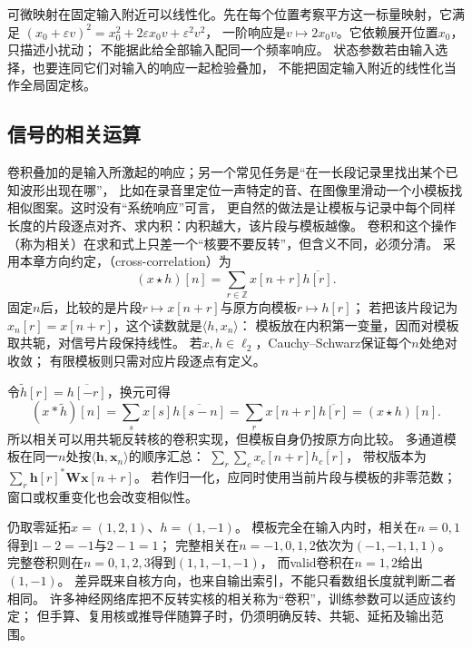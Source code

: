 可微映射在固定输入附近可以线性化。先在每个位置考察平方这一标量映射，它满足
$(x_0+\varepsilon v)^2=x_0^2+2\varepsilon x_0v+\varepsilon^2v^2$，
一阶响应是$v\mapsto2x_0v$。它依赖展开位置$x_0$，只描述小扰动；
不能据此给全部输入配同一个频率响应。
状态参数若由输入选择，也要连同它们对输入的响应一起检验叠加，
不能把固定输入附近的线性化当作全局固定核。

\subsection{信号的相关运算}
\label{sec:signal-template-correlation}

卷积叠加的是输入所激起的响应；另一个常见任务是“在一长段记录里找出某个已知波形出现在哪”，
比如在录音里定位一声特定的音、在图像里滑动一个小模板找相似图案。这时没有“系统响应”可言，
更自然的做法是让模板与记录中每个同样长度的片段逐点对齐、求内积：内积越大，该片段与模板越像。
卷积和这个操作（称为相关）在求和式上只差一个“核要不要反转”，但含义不同，必须分清。
采用本章方向约定，（cross-correlation）为
\begin{equation}
  (x\star h)[n]=\sum_{r\in\mathbb Z}x[n+r]\overline{h[r]}.
  \label{eq:signal-analysis-cross-correlation}
\end{equation}
固定$n$后，比较的是片段$r\mapsto x[n+r]$与原方向模板$r\mapsto h[r]$；
若把该片段记为$x_n[r]=x[n+r]$，这个读数就是$\langle h,x_n\rangle$：
模板放在内积第一变量，因而对模板取共轭，对信号片段保持线性。
若$x,h\in\ell_2$，Cauchy--Schwarz保证每个$n$处绝对收敛；
有限模板则只需对应片段逐点有定义。

令$\widetilde h[r]=\overline{h[-r]}$，换元可得
\[
  (x*\widetilde h)[n]=\sum_s x[s]\overline{h[s-n]}
  =\sum_r x[n+r]\overline{h[r]}=(x\star h)[n].
\]
所以相关可以用共轭反转核的卷积实现，但模板自身仍按原方向比较。
多通道模板在同一$n$处按$\langle\bm h,\bm x_n\rangle$的顺序汇总：
$\sum_r\sum_c x_c[n+r]\overline{h_c[r]}$，
带权版本为$\sum_r\bm h[r]^*\bm W\bm x[n+r]$。
若作归一化，应同时使用当前片段与模板的非零范数；窗口或权重变化也会改变相似性。

仍取零延拓$x=(1,2,1)$、$h=(1,-1)$。
模板完全在输入内时，相关在$n=0,1$得到$1-2=-1$与$2-1=1$；
完整相关在$n=-1,0,1,2$依次为$(-1,-1,1,1)$。
完整卷积则在$n=0,1,2,3$得到$(1,1,-1,-1)$，
而valid卷积在$n=1,2$给出$(1,-1)$。
差异既来自核方向，也来自输出索引，不能只看数组长度就判断二者相同。
许多神经网络库把不反转实核的相关称为“卷积”，训练参数可以适应该约定；
但手算、复用核或推导伴随算子时，仍须明确反转、共轭、延拓及输出范围。

